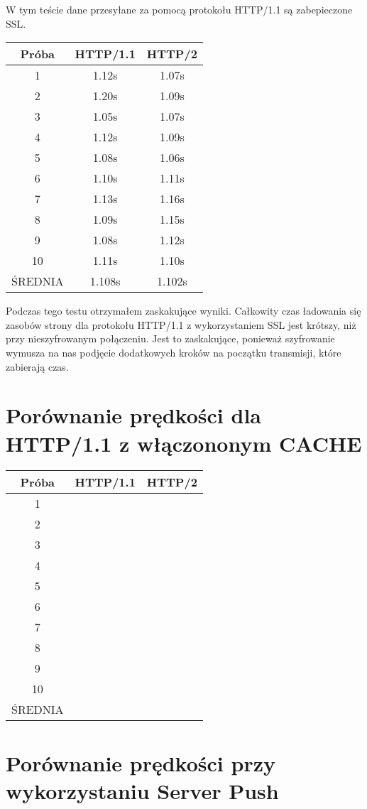 \documentclass[a4paper,12pt,twoside,openany]{report}
\begin{document}
W tym teście dane przesyłane za pomocą protokołu HTTP/1.1 są zabepieczone SSL.

\begin{tabular}{c|c|c}
Próba & HTTP/1.1 & HTTP/2 \\ \hline
1 & 1.12s & 1.07s \\
2 & 1.20s & 1.09s \\
3 & 1.05s & 1.07s \\
4 & 1.12s & 1.09s \\
5 & 1.08s & 1.06s \\
6 & 1.10s & 1.11s \\
7 & 1.13s & 1.16s \\
8 & 1.09s & 1.15s \\
9 & 1.08s & 1.12s \\
10 & 1.11s & 1.10s\\ \hline
ŚREDNIA & 1.108s & 1.102s \\
\end{tabular}

Podczas tego testu otrzymałem zaskakujące wyniki.
Całkowity czas ładowania się zasobów strony dla protokołu HTTP/1.1 z wykorzystaniem SSL jest krótszy, niż przy nieszyfrowanym połączeniu.
Jest to zaskakujące, ponieważ szyfrowanie wymusza na nas podjęcie dodatkowych kroków na początku transmisji, które zabierają czas.


\section{Porównanie prędkości dla HTTP/1.1 z włączononym CACHE}

\begin{tabular}{c|c|c}
Próba & HTTP/1.1 & HTTP/2 \\ \hline
1 & & \\
2 & & \\
3 & & \\
4 & & \\
5 & & \\
6 & & \\
7 & & \\
8 & & \\
9 & & \\
10 & & \\ \hline
ŚREDNIA & & \\
\end{tabular}


\section{Porównanie prędkości przy wykorzystaniu Server Push}
\end{document}
